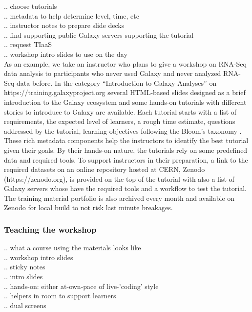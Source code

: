 \documentclass[10pt,letterpaper]{article}
\begin{document}
.. choose tutorials \\
.. metadata to help determine level, time, etc \\
.. instructor notes to prepare slide decks \\
.. find supporting public Galaxy servers supporting the tutorial \\
.. request TIaaS \\
.. workshop intro slides to use on the day \\



As an example, we take an instructor who plans to give a workshop on RNA-Seq data analysis to participants who never used Galaxy and never analyzed RNA-Seq data before.
In the category “Introduction to Galaxy Analyses” on https://training.galaxyproject.org several HTML-based slides designed as a brief introduction to the Galaxy ecosystem and some hands-on tutorials with different stories to introduce to Galaxy are available.
Each tutorial starts with a list of requirements, the expected level of learners, a rough time estimate, questions addressed by the tutorial, learning objectives following the Bloom’s taxonomy \cite{TODO}.
These rich metadata components help the instructors to identify the best tutorial given their goals.
By their hands-on nature, the tutorials rely on some predefined data and required tools.
To support instructors in their preparation, a link to the required datasets on an online repository hosted at CERN, Zenodo (https://zenodo.org), is provided on the top of the tutorial with also a list of Galaxy servers whose have the required tools and a workflow to test the tutorial.
The training material portfolio is also archived every month and available on Zenodo for local build to not risk last minute breakages.

\subsubsection*{Teaching the workshop}

.. what a course using the materials looks like \\
.. workshop intro slides \\
.. sticky notes \\
.. intro slides \\
.. hands-on: either at-own-pace of live-'coding' style \\
.. helpers in room to support learners \\
.. dual screens \\
\end{document}
